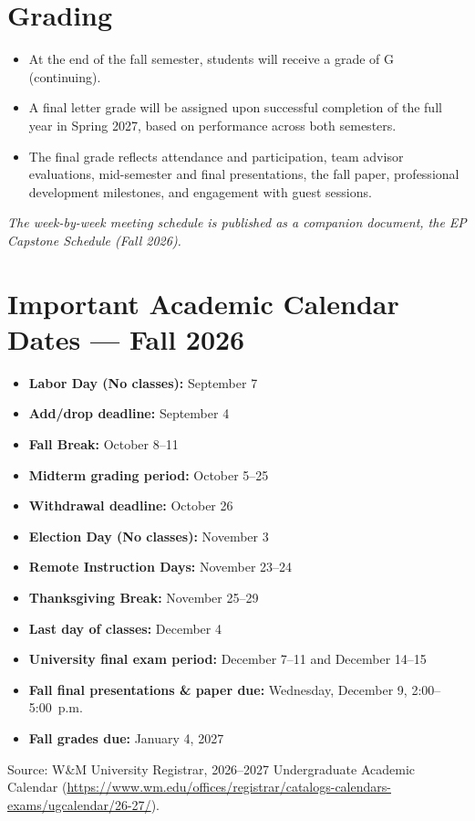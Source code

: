 \documentclass[11pt, letterpaper]{article}
\begin{document}
\section{Grading}
\label{sec:grading}
\begin{itemize}
    \item At the end of the fall semester, students will receive a grade of G (continuing).
    \item A final letter grade will be assigned upon successful completion of the full year in Spring 2027, based on performance across both semesters.
    \item The final grade reflects attendance and participation, team advisor evaluations, mid-semester and final presentations, the fall paper, professional development milestones, and engagement with guest sessions.
\end{itemize}

{\small\itshape\color{labMauveDark}The week-by-week meeting schedule is published as a companion document, the EP Capstone Schedule (Fall 2026).}

\section{Important Academic Calendar Dates --- Fall 2026}
\begin{itemize}
    \item \textbf{Labor Day (No classes):} September 7
    \item \textbf{Add/drop deadline:} September 4
    \item \textbf{Fall Break:} October 8--11
    \item \textbf{Midterm grading period:} October 5--25
    \item \textbf{Withdrawal deadline:} October 26
    \item \textbf{Election Day (No classes):} November 3
    \item \textbf{Remote Instruction Days:} November 23--24
    \item \textbf{Thanksgiving Break:} November 25--29
    \item \textbf{Last day of classes:} December 4
    \item \textbf{University final exam period:} December 7--11 and December 14--15
    \item \textbf{Fall final presentations \& paper due:} Wednesday, December 9, 2:00--5:00~p.m.
    \item \textbf{Fall grades due:} January 4, 2027
\end{itemize}
{\ttfamily\small\color{labMauveDark}Source: W\&M University Registrar, 2026--2027 Undergraduate Academic Calendar (\url{https://www.wm.edu/offices/registrar/catalogs-calendars-exams/ugcalendar/26-27/}).}
\end{document}
